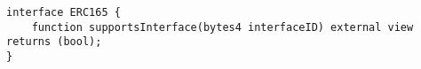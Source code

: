\begin{lstlisting}[language=Solidity]
	interface ERC165 {
	function supportsInterface(bytes4 interfaceID) external view returns (bool);
}
\end{lstlisting}